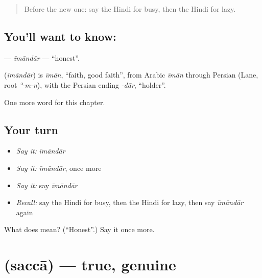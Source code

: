 \label{lesson:HI-C214-imandar}



\begin{quote}
Before the new one: say the Hindi for busy, then the Hindi for lazy.
\end{quote}

\subsection*{You'll want to know: }
\textbf{} — \emph{īmāndār} — \textquotedblleft{}honest\textquotedblright{}.

\begin{cousinweb}
\textbf{} (\emph{īmāndār}) is \emph{īmān}, \textquotedblleft{}faith, good faith\textquotedblright{}, from Arabic \emph{īmān} through Persian (Lane, root \emph{ʾ-m-n}), with the Persian ending \emph{-dār}, \textquotedblleft{}holder\textquotedblright{}.
\end{cousinweb}

\begin{grammarlens}[title={What you've built}]
One more word for this chapter.
\end{grammarlens}

\subsection*{Your turn}
\begin{itemize}
\raggedright
  \item \emph{Say it:} \emph{īmāndār}
  \item \emph{Say it:} \emph{īmāndār}, once more
  \item \emph{Say it:} say \emph{īmāndār}
  \item \emph{Recall:} say the Hindi for busy, then the Hindi for lazy, then say \emph{īmāndār} again
\end{itemize}

\begin{tcolorbox}[breakable,colback=teal!4,colframe=teal!35!black,title={Before you move on}]
What does  mean? (\textquotedblleft{}Honest\textquotedblright{}.) Say it once more.
\end{tcolorbox}
\section[\texorpdfstring{\hi{सच्चा} (saccā)}{सच्चा (saccā)}]{ (saccā) — true, genuine}

